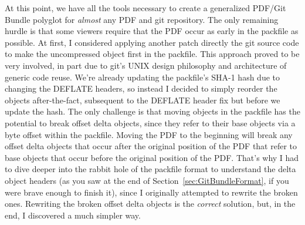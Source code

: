 \documentclass{article}
\begin{document}
At this point, we have all the tools necessary to create a generalized
PDF/Git Bundle polyglot for \emph{almost} any PDF and git
repository. The only remaining hurdle is that some viewers require
that the PDF occur as early in the packfile as possible. At first, I
considered applying another patch directly the git source code to make
the uncompressed object first in the packfile. This approach proved to
be very involved, in part due to git's UNIX design philosophy and
architecture of generic code reuse. We're already updating the
packfile's SHA-1 hash due to changing the DEFLATE headers, so instead
I decided to simply reorder the objects after-the-fact, subsequent to
the DEFLATE header fix but before we update the hash. The only
challenge is that moving objects in the packfile has the potential to
break offset delta objects, since they refer to their base objects via
a byte offset within the packfile.  Moving the PDF to the beginning
will break any offset delta objects that occur after the original
position of the PDF that refer to base objects that occur before the
original position of the PDF. That's why I had to dive deeper into the
rabbit hole of the packfile format to understand the delta object
headers (as you saw at the end of Section~\ref{sec:GitBundleFormat},
if you were brave enough to finish it), since I originally attempted
to rewrite the broken ones. Rewriting the broken offset delta objects
is the \emph{correct} solution, but, in the end, I discovered a much
simpler way.

\begin{center}
\end{center}
\end{document}
